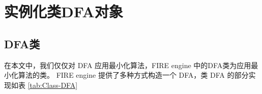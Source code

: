 \chapter{实例化类DFA对象}

\section{DFA类}
在本文中，我们仅仅对 DFA 应用最小化算法，FIRE engine 中的DFA类为应用最小化算法的类。
FIRE engine 提供了多种方式构造一个 DFA，类 DFA 的部分实现如表 \ref{tab:Class-DFA} 


